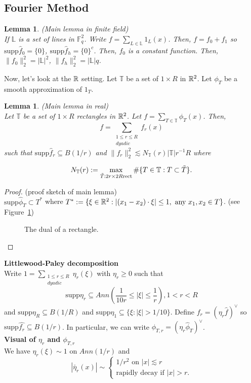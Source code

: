 \documentclass[12pt]{amsart}
\newtheorem{lemma}[theorem]{Lemma}
\newcommand{\F}{\mathbb{F}}
\newcommand{\LL}{\mathbb{L}}
\newcommand{\spp}{\textrm{supp}}
\newcommand{\T}{\mathbb{T}}
\begin{document}
\subsection{Fourier Method}
\begin{lemma}(Main lemma in finite field)\\
If $\LL$ is a set of lines in $\F_q^2$. Write $f=\sum_{L \in \LL}1_L(x)$. Then, 
$f=f_0+f_1$ so $\spp \hat{f}_0=\{0\}$, $\spp \hat{f}_h=\{0\}^c$.  Then, $f_0$ is a constant function. Then, $\|f_0\|_2^2=|\LL|^2$, $\|f_h\|_2^2=|\LL|q$. 
\end{lemma}
Now, let's look at the $\mathbb{R}$ setting. Let $\T$ be a set of $1 \times R$ in $\mathbb{R}^2$. Let $\phi_T$ be a smooth approximation of $1_T$.  
\begin{lemma}(Main lemma in real)\\
Let $\T$ be a set of $1 \times R$ rectangles in $\mathbb{R}^2$. Let $f=\sum_{T \in \T} \phi_T(x)$. Then, $$f=\sum_{\substack{1\leq r \leq R\\ dyadic}}f_r(x)$$
such that $\spp \hat{f}_r \subseteq B(1/r)$ and $\|f_r\|_2^2\lesssim N_{\T}(r)|\T|r^{-1}R$ where

$$N_\T(r):=\max_{\Tilde{T}: 2r \times 2R \text{rect}} \#\{T \in \T: T \subset \Tilde{T}\}. $$
\end{lemma}
\begin{proof}(proof sketch of main lemma)\\
$\spp \hat{\phi}_T\subset T^*$ where
$T^*:=\{\xi \in \mathbb{R}^2: |(x_1-x_2)\cdot \xi|\leq 1, \text{ any }x_1,x_2\in T\}$. (see Figure~\ref{fig:dualrectangle})
\begin{figure}[h]
    \centering
    
    \caption{The dual of a rectangle.}
    \label{fig:dualrectangle}
\end{figure}
\end{proof}
\textbf{Littlewood-Paley decomposition}\\
Write $1=\sum_{\substack{1\leq r \leq R\\ dyadic}} \eta_r(\xi)$ with $\eta_r \geq 0$ such that 
$$\spp \eta_r \subseteq Ann(\frac{1}{10r} \leq |\xi| \leq \frac{1}{r}), 1 < r <R$$
and $\spp \eta_R \subseteq B(1/R)$ and $\spp \eta_1 \subseteq \{\xi: |\xi|>1/10\}$. 
Define $f_r=(\eta_r \hat f)^\vee$ so $\spp \hat{f_r} \subseteq B(1/r)$. 
In particular, we can write $\phi_{T,r}={(\eta_r \hat{\phi}_T)}^{\vee}$.\\
\textbf{Visual of $\hat{\eta_r}$ and $\phi_{T,r}$}\\
We have $\eta_r(\xi)\sim 1 $ on $Ann(1/r)$ and 
$$|\check{\eta_r}(x)|\sim \begin{cases}
    1/r^2 \text{ on }|x|\lesssim r\\
    \text{rapidly decay if } |x|>r. 
\end{cases}$$
\end{document}
